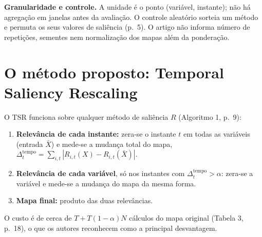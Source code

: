 \documentclass[11pt,a4paper]{article}
\begin{document}
\textbf{Granularidade e controle.} A unidade é o ponto (variável, instante); não há agregação em janelas antes da avaliação. O controle aleatório sorteia um método e permuta os seus valores de saliência (p.~5). O artigo não informa número de repetições, sementes nem normalização dos mapas além da ponderação.

\section{O método proposto: Temporal Saliency Rescaling}
O TSR funciona sobre qualquer método de saliência $R$ (Algoritmo 1, p.~9):
\begin{enumerate}
\item \textbf{Relevância de cada instante:} zera-se o instante $t$ em todas as variáveis (entrada $\bar{X}$) e mede-se a mudança total do mapa, $\Delta^{\text{tempo}}_t = \sum_{i,t} |R_{i,t}(X) - R_{i,t}(\bar{X})|$.
\item \textbf{Relevância de cada variável}, só nos instantes com $\Delta^{\text{tempo}}_t > \alpha$: zera-se a variável e mede-se a mudança do mapa da mesma forma.
\item \textbf{Mapa final:} produto das duas relevâncias.
\end{enumerate}
O custo é de cerca de $T + T(1-\alpha)N$ cálculos do mapa original (Tabela 3, p.~18), o que os autores reconhecem como a principal desvantagem.
\end{document}
